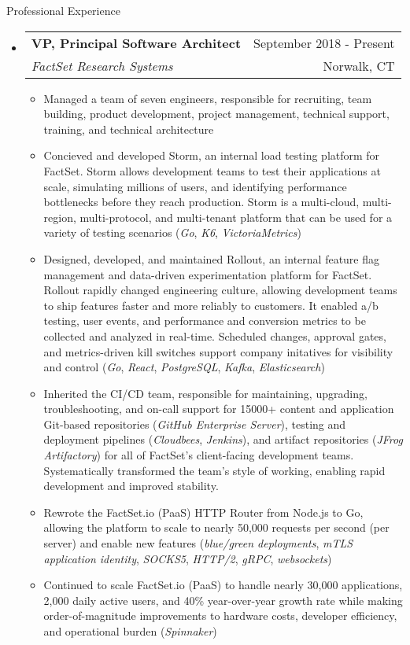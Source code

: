 \documentclass[letterpaper,10pt]{article}
\makeatletter
\newenvironment{ressection}[1]{
	\vspace{4pt}
	{\fontfamily{phv}\selectfont\Large#1}
	\begin{itemize}
	\vspace{3pt}
}{
	\end{itemize}
}
\newcommand{\ressubitem}[1]{
	\vspace{-1pt}
	\item \begin{flushleft} #1 \end{flushleft}
}
\newcommand{\resbigitem}[4]{
	\vspace{-5pt}
	\item
	\begin{tabular*}{6in}{l@{\extracolsep{\fill}}r}
		\textbf{#1} & #2 \\
		\textit{#3} & #4\\
	\end{tabular*}
}
\newenvironment{ressubsec}[4]{
	\resbigitem{#1}{#2}{#3}{#4}
	\vspace{-2pt}
	\begin{itemize}
}{
	\end{itemize}
}
\makeatother
\begin{document}
\begin{ressection}{Professional Experience}
	\begin{ressubsec}{VP, Principal Software Architect}{September 2018 - Present}{FactSet Research Systems}{Norwalk, CT}
		\ressubitem{Managed a team of seven engineers, responsible for recruiting, team building, product development, project management, technical support, training, and technical architecture}
		\ressubitem{Concieved and developed Storm, an internal load testing platform for FactSet.  Storm allows development teams to test their applications at scale, simulating millions of users, and identifying performance bottlenecks before they reach production.  Storm is a multi-cloud, multi-region, multi-protocol, and multi-tenant platform that can be used for a variety of testing scenarios (\textit{Go}, \textit{K6}, \textit{VictoriaMetrics})}
		\ressubitem{Designed, developed, and maintained Rollout, an internal feature flag management and data-driven experimentation platform for FactSet.  Rollout rapidly changed engineering culture, allowing development teams to ship features faster and more reliably to customers.  It enabled a/b testing, user events, and performance and conversion metrics to be collected and analyzed in real-time.  Scheduled changes, approval gates, and metrics-driven kill switches support company initatives for visibility and control (\textit{Go}, \textit{React}, \textit{PostgreSQL}, \textit{Kafka}, \textit{Elasticsearch})}
		\ressubitem{Inherited the CI/CD team, responsible for maintaining, upgrading, troubleshooting, and on-call support for 15000+ content and application Git-based repositories (\textit{GitHub Enterprise Server}), testing and deployment pipelines (\textit{Cloudbees}, \textit{Jenkins}), and artifact repositories (\textit{JFrog Artifactory}) for all of FactSet's client-facing development teams.  Systematically transformed the team's style of working, enabling rapid development and improved stability.}
		\ressubitem{Rewrote the FactSet.io (PaaS) HTTP Router from Node.js to Go, allowing the platform to scale to nearly 50,000 requests per second (per server) and enable new features (\textit{blue/green deployments}, \textit{mTLS application identity}, \textit{SOCKS5}, \textit{HTTP/2}, \textit{gRPC}, \textit{websockets})}
		\ressubitem{Continued to scale FactSet.io (PaaS) to handle nearly 30,000 applications, 2,000 daily active users, and 40\% year-over-year growth rate while making order-of-magnitude improvements to hardware costs, developer efficiency, and operational burden (\textit{Spinnaker})}

\end{ressubsec}
\end{ressection}
\end{document}
